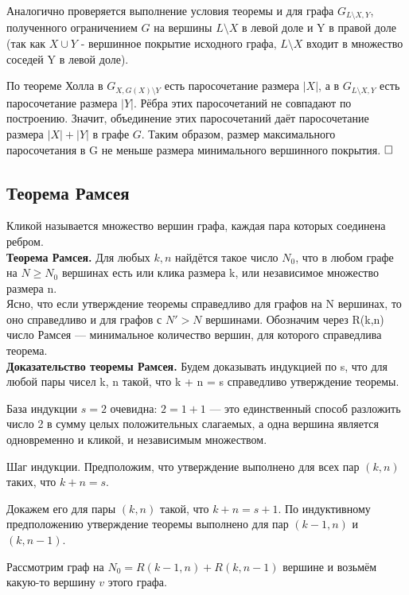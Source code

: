 \documentclass[a4paper, 10pt]{article}
\begin{document}
Аналогично проверяется выполнение условия теоремы и для графа $G_{L \setminus X, Y}$, полученного ограничением $G$ на вершины $L \setminus X$ в левой доле и Y в правой доле (так как $X \cup Y$ - вершинное покрытие исходного графа, $L \setminus X$ входит в множество соседей Y в левой доле). 

По теореме Холла в $G_{X, G(X) \setminus Y}$ есть паросочетание размера $|X|$, а в $G_{L \setminus X, Y} $ есть паросочетание размера $|Y|$. Рёбра этих паросочетаний не совпадают по построению. Значит, объединение этих паросочетаний даёт паросочетание размера $|X| + |Y|$ в графе $G$. Таким образом, размер максимального паросочетания в G не меньше размера минимального вершинного покрытия. $\hfill \square$



\subsection{Теорема Рамсея}

Кликой называется множество вершин графа, каждая пара которых соединена ребром. \\

\textbf{Теорема Рамсея.} Для любых $k, n$ найдётся такое число $N_0$, что в любом графе на $N \geqslant N_0$ вершинах есть или клика размера k, или независимое множество размера n. \\

Ясно, что если утверждение теоремы справедливо для графов на N вершинах, то оно справедливо и для графов с $N' > N$ вершинами. Обозначим через R(k,n) число Рамсея — минимальное количество вершин, для которого справедлива теорема. \\

\textbf{Доказательство теоремы Рамсея.} Будем доказывать индукцией по s, что для любой пары чисел k, n такой, что k + n = s справедливо утверждение теоремы.

База индукции $s = 2$ очевидна: $2 = 1 + 1$ — это единственный способ разложить число 2 в сумму целых положительных слагаемых, а одна вершина является одновременно и кликой, и независимым множеством.

Шаг индукции. Предположим, что утверждение выполнено для всех пар $(k, n)$ таких, что $k + n = s$.

Докажем его для пары $(k, n)$ такой, что $k + n = s + 1$. По индуктивному предположению утверждение теоремы выполнено для пар $(k - 1, n)$ и $(k, n - 1)$.

Рассмотрим граф на $N_0 = R(k - 1, n) + R(k, n - 1)$ вершине и возьмём какую-то вершину $v$ этого графа.
\end{document}
